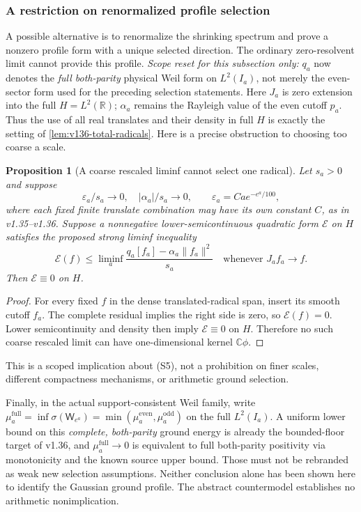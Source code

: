 \documentclass[11pt]{article}
\newtheorem{proposition}[theorem]{Proposition}
\theoremstyle{remark}
\begin{document}
\subsubsection{A restriction on renormalized profile selection}

A possible alternative is to renormalize the shrinking spectrum and
prove a nonzero profile form with a unique selected direction.
The ordinary zero-resolvent limit cannot provide this profile.
\emph{Scope reset for this subsection only:} $q_a$ now denotes the
\emph{full both-parity} physical Weil form on $L^2(I_a)$, not merely
the even-sector form used for the preceding selection statements.
Here $J_a$ is zero extension into the full $H=L^2(\mathbb R)$;
$\alpha_a$ remains the Rayleigh value of the even cutoff $p_a$.
Thus the use of all real translates and their density in full $H$
is exactly the setting of \ref{lem:v136-total-radicals}.
Here is a precise obstruction to choosing too coarse a scale.
\begin{proposition}[A coarse rescaled liminf cannot select one radical]
\label{prop:ns43-ccm-coarse-profile}
Let $s_a>0$ and suppose
\[
 \varepsilon_a/s_a\to0,\quad |\alpha_a|/s_a\to0,
 \qquad \varepsilon_a=Ca e^{-e^a/100},
\]
where each fixed finite translate combination may have its own constant
$C$, as in v1.35--v1.36. Suppose a nonnegative lower-semicontinuous
quadratic form $\mathcal E$ on $H$ satisfies the proposed strong
liminf inequality
\[
 \mathcal E(f)\le\liminf_a
 \frac{q_a[f_a]-\alpha_a\|f_a\|^2}{s_a}
 \quad\text{whenever }J_af_a\to f.
 \tag{S5}
\]
Then $\mathcal E\equiv0$ on $H$.
\end{proposition}
\begin{proof}
For every fixed $f$ in the dense translated-radical span, insert its
smooth cutoff $f_a$. The complete residual implies the right side is
zero, so $\mathcal E(f)=0$. Lower semicontinuity and density then imply
$\mathcal E\equiv0$ on $H$. Therefore no such coarse rescaled limit
can have one-dimensional kernel $\mathbb C\phi$.
\end{proof}
This is a scoped implication about (S5), not a prohibition on finer
scales, different compactness mechanisms, or arithmetic ground selection.

Finally, in the actual support-consistent Weil family, write
$\mu_a^{\mathrm{full}}=\inf\sigma(\mathsf W_{e^a})
=\min(\mu_a^{\mathrm{even}},\mu_a^{\mathrm{odd}})$ on the full
$L^2(I_a)$. A uniform lower bound on this \emph{complete, both-parity}
ground energy is already the bounded-floor
target of v1.36, and $\mu_a^{\mathrm{full}}\to0$ is equivalent to
full both-parity positivity
via monotonicity and the known source upper bound. Those must not be
rebranded as weak new selection assumptions. Neither conclusion alone
has been shown here to identify the Gaussian ground profile. The
abstract countermodel establishes no arithmetic nonimplication.
\end{document}
